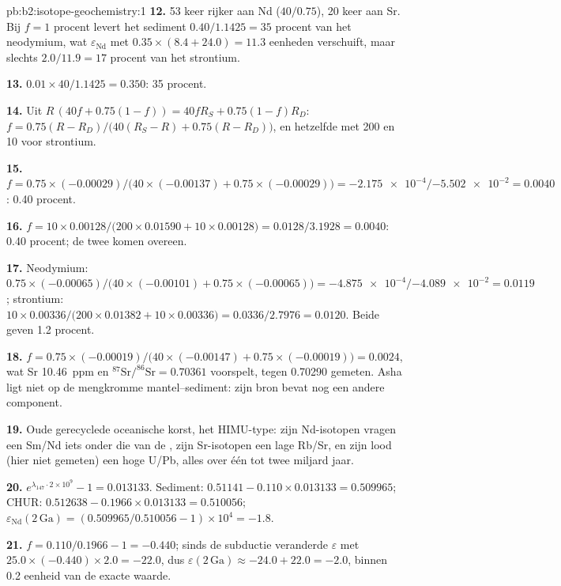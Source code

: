 \begin{solution}{pb:b2:isotope-geochemistry:1}
\textbf{12.} 53 keer rijker aan Nd ($40/0.75$), 20 keer aan Sr. Bij $f = 1$ procent levert het
sediment $0.40/1.1425 = 35$ procent van het neodymium, wat
$\varepsilon_{\mathrm{Nd}}$ met $0.35\times(8.4 + 24.0) = 11.3$ eenheden verschuift, maar slechts $2.0/11.9 =
17$ procent van het strontium.

\textbf{13.} $0.01\times40/1.1425 = 0.350$: 35 procent.

\textbf{14.} Uit $R\,(40f + 0.75(1-f)) = 40fR_S + 0.75(1-f)R_D$:
$f = 0.75(R - R_D)/\bigl(40(R_S - R) + 0.75(R - R_D)\bigr)$, en hetzelfde met 200
en 10 voor strontium.

\textbf{15.} $f = 0.75\times(-0.00029)/\bigl(40\times(-0.00137) + 0.75\times(-0.00029)\bigr)
= \num{-2.175e-4}/\num{-5.502e-2} = 0.0040$: 0.40 procent.

\textbf{16.} $f = 10\times0.00128/\bigl(200\times0.01590 + 10\times0.00128\bigr) =
0.0128/3.1928 = 0.0040$: 0.40 procent; de twee komen overeen.

\textbf{17.} Neodymium: $0.75\times(-0.00065)/\bigl(40\times(-0.00101) +
0.75\times(-0.00065)\bigr) = \num{-4.875e-4}/\num{-4.089e-2} = 0.0119$; strontium:
$10\times0.00336/\bigl(200\times0.01382 + 10\times0.00336\bigr) = 0.0336/2.7976 = 0.0120$.
Beide geven 1.2 procent.

\textbf{18.} $f = 0.75\times(-0.00019)/\bigl(40\times(-0.00147) + 0.75\times(-0.00019)\bigr)
= 0.0024$, wat Sr \qty{10.46}{ppm} en $^{87}\mathrm{Sr}/^{86}\mathrm{Sr} =
0.70361$ voorspelt, tegen 0.70290 gemeten. Asha ligt niet op de mengkromme mantel--sediment:
zijn bron bevat nog een andere component.

\textbf{19.} Oude gerecyclede oceanische korst, het HIMU-type: zijn Nd-isotopen vragen een Sm/Nd
iets onder die van de , zijn Sr-isotopen een lage Rb/Sr, en zijn
lood (hier niet gemeten) een hoge U/Pb, alles over één tot twee miljard jaar.

\textbf{20.} $e^{\lambda_{147}\cdot2\times10^9} - 1 = 0.013133$. Sediment: $0.51141 -
0.110\times0.013133 = 0.509965$; CHUR: $0.512638 - 0.1966\times0.013133 = 0.510056$;
$\varepsilon_{\mathrm{Nd}}(2\,\mathrm{Ga}) = (0.509965/0.510056 - 1)\times10^4 = -1.8$.

\textbf{21.} $f = 0.110/0.1966 - 1 = -0.440$; sinds de subductie veranderde $\varepsilon$ met
$25.0\times(-0.440)\times2.0 = -22.0$, dus $\varepsilon(2\,\mathrm{Ga}) \approx -24.0 + 22.0
= -2.0$, binnen 0.2 eenheid van de exacte waarde.


\end{solution}
